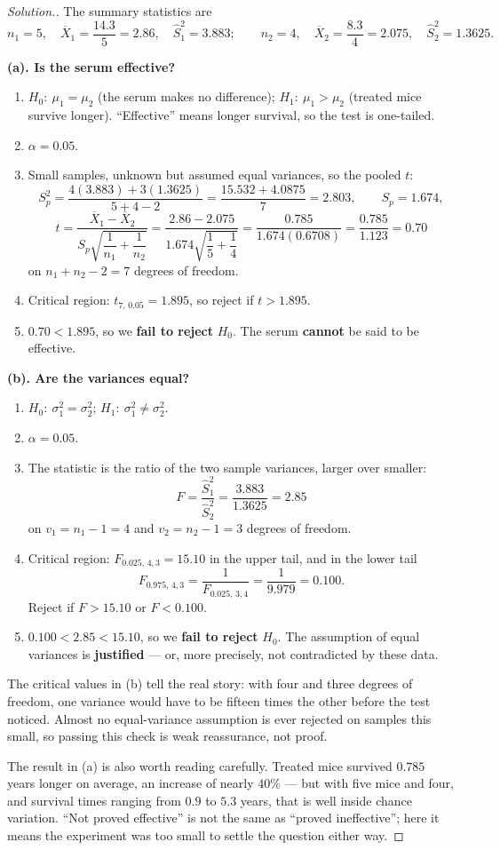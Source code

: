 \documentclass[11pt,a4paper]{article}
\theoremstyle{definition}
\newenvironment{solution}
  {\renewcommand{\qedsymbol}{}\begin{proof}[\textit{Solution}.]}
  {\end{proof}}
\begin{document}
\begin{solution}
The summary statistics are
\[n_1=5,\quad \overline{X}_1=\frac{14.3}{5}=2.86,\quad \hat{S}_1^2=3.883;\qquad
n_2=4,\quad \overline{X}_2=\frac{8.3}{4}=2.075,\quad \hat{S}_2^2=1.3625.\]

\textbf{(a). Is the serum effective?}
\begin{enumerate}
\item $H_0:\ \mu_1=\mu_2$ (the serum makes no difference); $H_1:\ \mu_1>\mu_2$ (treated mice
survive longer). ``Effective'' means longer survival, so the test is one-tailed.
\item $\alpha=0.05$.
\item Small samples, unknown but assumed equal variances, so the pooled $t$:
\[S_p^2=\frac{4(3.883)+3(1.3625)}{5+4-2}=\frac{15.532+4.0875}{7}=2.803,
\qquad S_p=1.674,\]
\[t=\frac{\overline{X}_1-\overline{X}_2}{S_p\sqrt{\dfrac{1}{n_1}+\dfrac{1}{n_2}}}
=\frac{2.86-2.075}{1.674\sqrt{\dfrac{1}{5}+\dfrac{1}{4}}}
=\frac{0.785}{1.674(0.6708)}=\frac{0.785}{1.123}=0.70\]
on $n_1+n_2-2=7$ degrees of freedom.
\item Critical region: $t_{7,\,0.05}=1.895$, so reject if $t>1.895$.
\item $0.70<1.895$, so we \textbf{fail to reject} $H_0$. The serum \textbf{cannot} be said
to be effective.
\end{enumerate}

\textbf{(b). Are the variances equal?}
\begin{enumerate}
\item $H_0:\ \sigma_1^2=\sigma_2^2$; $H_1:\ \sigma_1^2\neq\sigma_2^2$.
\item $\alpha=0.05$.
\item The statistic is the ratio of the two sample variances, larger over smaller:
\[F=\frac{\hat{S}_1^2}{\hat{S}_2^2}=\frac{3.883}{1.3625}=2.85\]
on $v_1=n_1-1=4$ and $v_2=n_2-1=3$ degrees of freedom.
\item Critical region: $F_{0.025,\,4,3}=15.10$ in the upper tail, and in the lower tail
\[F_{0.975,\,4,3}=\frac{1}{F_{0.025,\,3,4}}=\frac{1}{9.979}=0.100.\]
Reject if $F>15.10$ or $F<0.100$.
\item $0.100<2.85<15.10$, so we \textbf{fail to reject} $H_0$. The assumption of equal
variances is \textbf{justified} --- or, more precisely, not contradicted by these data.
\end{enumerate}

The critical values in (b) tell the real story: with four and three degrees of freedom, one
variance would have to be fifteen times the other before the test noticed. Almost no
equal-variance assumption is ever rejected on samples this small, so passing this check is
weak reassurance, not proof.

The result in (a) is also worth reading carefully. Treated mice survived $0.785$ years
longer on average, an increase of nearly $40\%$ --- but with five mice and four, and
survival times ranging from $0.9$ to $5.3$ years, that is well inside chance variation.
``Not proved effective'' is not the same as ``proved ineffective''; here it means the
experiment was too small to settle the question either way.
\end{solution}
\end{document}
